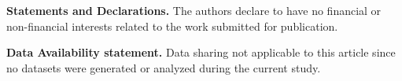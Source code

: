 \documentclass{article}
\theoremstyle{plain}
\theoremstyle{definition}
\numberwithin{equation}{section}
\begin{document}
\smallskip

{\textbf{Statements and Declarations.} The authors declare to have no financial or non-financial interests related to the work submitted for publication.}

\smallskip

{\textbf{Data Availability statement.} Data sharing not applicable to this article since no datasets were generated or analyzed during the current study.}

 
 
\end{document}
